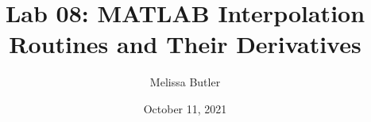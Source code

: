 \title{Lab 08: MATLAB Interpolation Routines and Their Derivatives}
\author{Melissa Butler}
\date{October 11, 2021}
